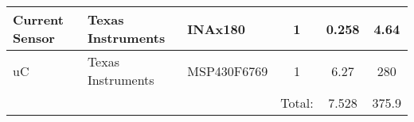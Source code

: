 \begin{table}
\begin{tabular}{|l|l|l|c|c|c|}
\hline
Current Sensor       & Texas Instruments    & INAx180                                   & 1                           & 0.258                           & 4.64                                     \\ 
\hline
uC                   & Texas Instruments    & \textcolor[rgb]{0.2,0.2,0.2}{MSP430F6769} & 1                           & 6.27                            & 280                                      \\ 
\hline
\multicolumn{1}{l}{} & \multicolumn{1}{l}{} &                                           & \multicolumn{1}{l|}{Total:} & 7.528                           & 375.9                                    \\
\cline{4-6}
\end{tabular}
\end{table}